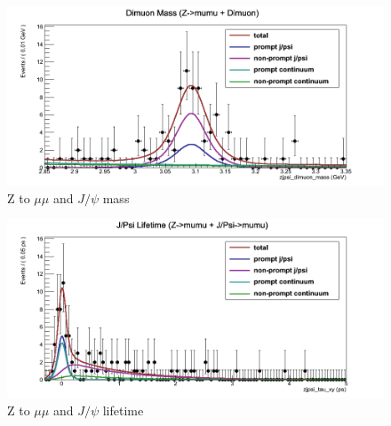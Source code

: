 \documentclass[a4paper,12pt]{article}
\begin{document}
\begin{figure}[]
    \centering
      \includegraphics[scale=0.4]{Images/ztomumu_jpsi_dimuon_mass0.png}
    \caption{Z to $\mu\mu$ and $J\slash\psi$ mass}
\end{figure}
\begin{figure}[]
    \centering
      \includegraphics[scale=0.4]{Images/ztomumu_jpsi_tau_xy0.png}
    \caption{Z to $\mu\mu$ and $J\slash\psi$ lifetime}
\end{figure}
\end{document}

